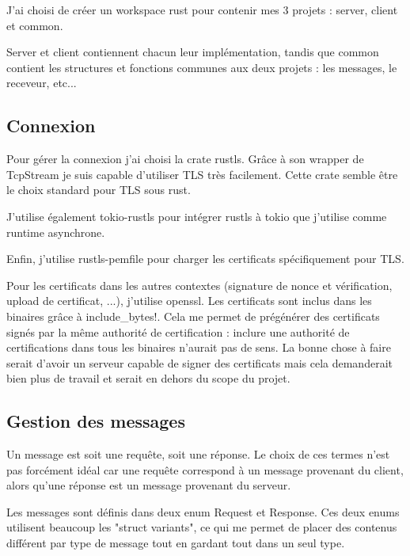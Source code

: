 \documentclass[french]{article}
\begin{document}
J'ai choisi de créer un workspace rust pour contenir mes 3 projets : server, client et common.

\medspace

Server et client contiennent chacun leur implémentation, tandis que common contient les structures et fonctions communes aux deux projets : les messages, le receveur, etc...

\subsection{Connexion}
\label{conn}

Pour gérer la connexion j'ai choisi la crate rustls. Grâce à son wrapper de TcpStream je suis capable d'utiliser TLS très facilement. Cette crate semble être le choix standard pour TLS sous rust.

\medspace

J'utilise également tokio-rustls pour intégrer rustls à tokio que j'utilise comme runtime asynchrone.

\medspace

Enfin, j'utilise rustls-pemfile pour charger les certificats spécifiquement pour TLS.

\medspace

Pour les certificats dans les autres contextes (signature de nonce et vérification, upload de certificat, ...), j'utilise openssl.
Les certificats sont inclus dans les binaires grâce à include\_bytes!. Cela me permet de prégénérer des certificats signés par la même authorité de certification : inclure une authorité de certifications dans tous les binaires n'aurait pas de sens. La bonne chose à faire serait d'avoir un serveur capable de signer des certificats mais cela demanderait bien plus de travail et serait en dehors du scope du projet.

\subsection{Gestion des messages}

Un message est soit une requête, soit une réponse. Le choix de ces termes n'est pas forcément idéal car une requête correspond à un message provenant du client, alors qu'une réponse est un message provenant du serveur.

\medspace

Les messages sont définis dans deux enum Request et Response. Ces deux enums utilisent beaucoup les "struct variants", ce qui me permet de placer des contenus différent par type de message tout en gardant tout dans un seul type.
\end{document}

